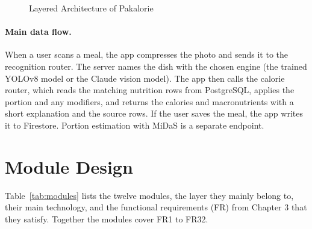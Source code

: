 \begin{figure}[H]
{}
\caption{Layered Architecture of Pakalorie}
\label{fig:arch}
\end{figure}

\paragraph{Main data flow.} When a user scans a meal, the app compresses the photo and sends it
to the recognition router. The server names the dish with the chosen engine (the trained YOLOv8
model or the Claude vision model). The app then calls the calorie router, which reads the matching
nutrition rows from PostgreSQL, applies the portion and any modifiers, and returns the calories and
macronutrients with a short explanation and the source rows. If the user saves the meal, the app
writes it to Firestore. Portion estimation with MiDaS is a separate endpoint.

\section{Module Design}
Table~\ref{tab:modules} lists the twelve modules, the layer they mainly belong to, their main
technology, and the functional requirements (FR) from Chapter 3 that they satisfy. Together the
modules cover FR1 to FR32.

